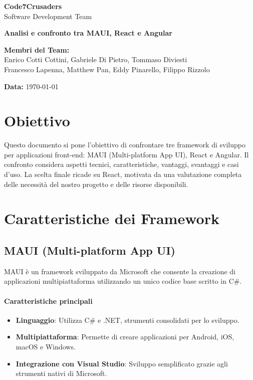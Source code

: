\documentclass{article}
\begin{document}
\begin{titlepage}
    {\Huge \textbf{Code7Crusaders}}\\
    \vspace{0.5cm}
    {\Large Software Development Team}\\
    \vspace{2cm}
    
    {\large \textbf{Analisi e confronto tra MAUI, React e Angular}}\\
    \vspace{5cm}

    \textbf{Membri del Team:}\\
    Enrico Cotti Cottini, Gabriele Di Pietro, Tommaso Diviesti \\
    Francesco Lapenna, Matthew Pan, Eddy Pinarello, Filippo Rizzolo \\
    \vspace{0.5cm}
    
    {\large \textbf{Data:}} \today\\
    
    \vspace{1cm}
\end{titlepage}

\newpage
\tableofcontents
\newpage

\section{Obiettivo}
Questo documento si pone l'obiettivo di confrontare tre framework di sviluppo per applicazioni front-end: MAUI (Multi-platform App UI), React e Angular. Il confronto considera aspetti tecnici, caratteristiche, vantaggi, svantaggi e casi d'uso. La scelta finale ricade su React, motivata da una valutazione completa delle necessit\`a del nostro progetto e delle risorse disponibili.

\section{Caratteristiche dei Framework}

\subsection{MAUI (Multi-platform App UI)}
MAUI \`e un framework sviluppato da Microsoft che consente la creazione di applicazioni multipiattaforma utilizzando un unico codice base scritto in C\#.

\paragraph*{Caratteristiche principali}
\begin{itemize}
    \item \textbf{Linguaggio}: Utilizza C\# e .NET, strumenti consolidati per lo sviluppo.
    \item \textbf{Multipiattaforma}: Permette di creare applicazioni per Android, iOS, macOS e Windows.
    \item \textbf{Integrazione con Visual Studio}: Sviluppo semplificato grazie agli strumenti nativi di Microsoft.
\end{itemize}
\end{document}

